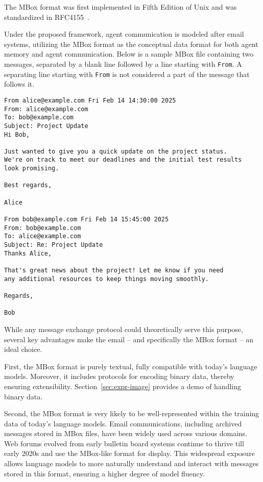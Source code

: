 The MBox format was first implemented in Fifth Edition of Unix and was standardized in RFC4155~\cite{rfc4155}.

Under the proposed framework, agent communication is modeled after email systems, utilizing the MBox format as the conceptual data format for both agent memory and agent communication.  Below is a sample MBox file containing two messages, separated by a blank line followed by a line starting with \texttt{From}.  A separating line starting with \texttt{From} is not considered a part of the message that follows it.

\begin{verbatim}
From alice@example.com Fri Feb 14 14:30:00 2025
From: alice@example.com
To: bob@example.com
Subject: Project Update
Hi Bob,

Just wanted to give you a quick update on the project status.
We're on track to meet our deadlines and the initial test results
look promising.

Best regards,

Alice

From bob@example.com Fri Feb 14 15:45:00 2025
From: bob@example.com
To: alice@example.com
Subject: Re: Project Update
Thanks Alice,

That's great news about the project! Let me know if you need
any additional resources to keep things moving smoothly.

Regards,

Bob
\end{verbatim}

While any message exchange protocol could theoretically serve this purpose, several key advantages make the email -- and specifically the MBox format -- an ideal choice.

First, the MBox format is purely textual, fully compatible with today's language models.  Moreover, it includes protocols for encoding binary data, thereby ensuring extensibility.
Section~\ref{sec:expr-image} provides a demo of handling binary data.

Second, the MBox format is very likely to be well-represented within the training data of today's language models. Email communications, including archived messages stored in MBox files, have been widely used across various domains.  Web forums evolved from early bulletin board systems continue to thrive till early 2020s and use the MBox-like format for display. This widespread exposure allows language models to more naturally understand and interact with messages stored in this format, ensuring a higher degree of model fluency.

